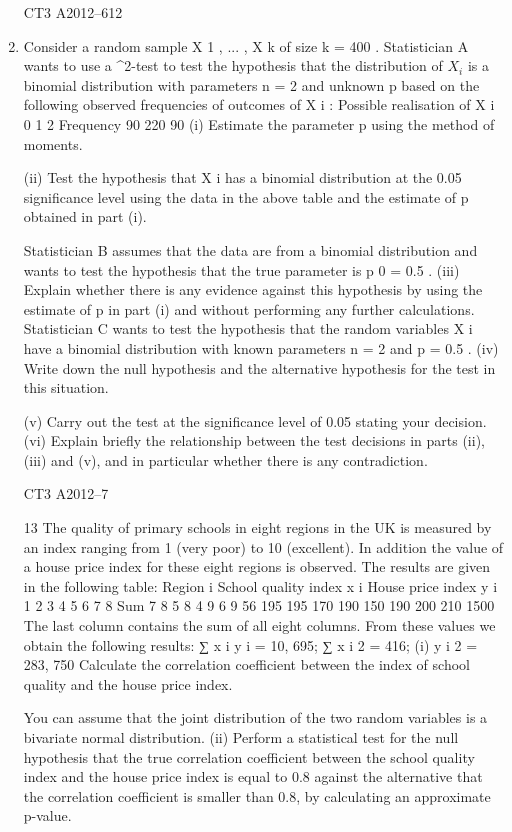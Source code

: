 \documentclass[a4paper,12pt]{article}
\begin{document}
\begin{enumerate}
CT3 A2012–612

\item Consider a random sample X 1 , ... , X k of size k = 400 . Statistician A wants to use a
\chi^2-test to test the hypothesis that the distribution of $X_i$ is a binomial distribution
with parameters n = 2 and unknown p based on the following observed frequencies
of outcomes of X i :
Possible realisation of X i 0 1 2
Frequency 90 220 90
(i) Estimate the parameter p using the method of moments.

(ii) Test the hypothesis that X i has a binomial distribution at the 0.05 significance
level using the data in the above table and the estimate of p obtained in
part (i).

Statistician B assumes that the data are from a binomial distribution and wants to test
the hypothesis that the true parameter is p 0 = 0.5 .
(iii)
Explain whether there is any evidence against this hypothesis by using the
estimate of p in part (i) and without performing any further calculations. 
Statistician C wants to test the hypothesis that the random variables X i have a
binomial distribution with known parameters n = 2 and p = 0.5 .
(iv) Write down the null hypothesis and the alternative hypothesis for the test in
this situation.

(v) Carry out the test at the significance level of 0.05 stating your decision.
(vi) Explain briefly the relationship between the test decisions in parts (ii), (iii) and
(v), and in particular whether there is any contradiction.


CT3 A2012–7

\newpage

13
The quality of primary schools in eight regions in the UK is measured by an index
ranging from 1 (very poor) to 10 (excellent). In addition the value of a house price
index for these eight regions is observed. The results are given in the following table:
Region i
School quality index x i
House price index y i
1
2
3
4
5
6
7
8
Sum
7
8
5
8
4
9
6
9
56
195 195 170 190 150 190 200 210 1500
The last column contains the sum of all eight columns.
From these values we obtain the following results:
∑ x i y i = 10, 695; ∑ x i 2 = 416;
(i)
\sum y i 2 = 283, 750
Calculate the correlation coefficient between the index of school quality and
the house price index.

You can assume that the joint distribution of the two random variables is a bivariate
normal distribution.
(ii) Perform a statistical test for the null hypothesis that the true correlation
coefficient between the school quality index and the house price index is
equal to 0.8 against the alternative that the correlation coefficient is smaller
than 0.8, by calculating an approximate p-value.


\end{enumerate}
\end{document}
